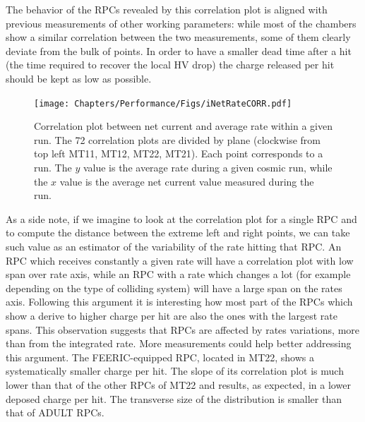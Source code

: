 The behavior of the RPCs revealed by this correlation plot is aligned with previous measurements of other working parameters: while most of the chambers show a similar correlation between the two measurements, some of them clearly deviate from the bulk of points.
In order to have a smaller dead time after a hit (the time required to recover the local HV drop) the charge released per hit should be kept as low as possible.

\begin{figure}[!t]
\begin{center}
\texttt{[image: Chapters/Performance/Figs/iNetRateCORR.pdf]}
\caption{Correlation plot between net current and average rate within a given run. The 72 correlation plots are divided by plane (clockwise from top left MT11, MT12, MT22, MT21). Each point corresponds to a run. The $y$ value is the average rate during a given cosmic run, while the $x$ value is the average net current value measured during the run.}
\label{fig:iNetvsRate4Planes}
\end{center}
\end{figure}

As a side note, if we imagine to look at the correlation plot for a single RPC and to compute the distance between the extreme left and right points, we can take such value as an estimator of the variability of the rate hitting that RPC.
An RPC which receives constantly a given rate will have a correlation plot with low span over rate axis, while an RPC with a rate which changes a lot (for example depending on the type of colliding system) will have a large span on the rates axis.
Following this argument it is interesting how most part of the RPCs which show a derive to higher charge per hit are also the ones with the largest rate spans.
This observation suggests that RPCs are affected by rates variations, more than from the integrated rate.
More measurements could help better addressing this argument.
The FEERIC-equipped RPC, located in MT22, shows a systematically smaller charge per hit.
The slope of its correlation plot is much lower than that of the other RPCs of MT22 and results, as expected, in a lower deposed charge per hit.
The transverse size of the distribution is smaller than that of ADULT RPCs.
